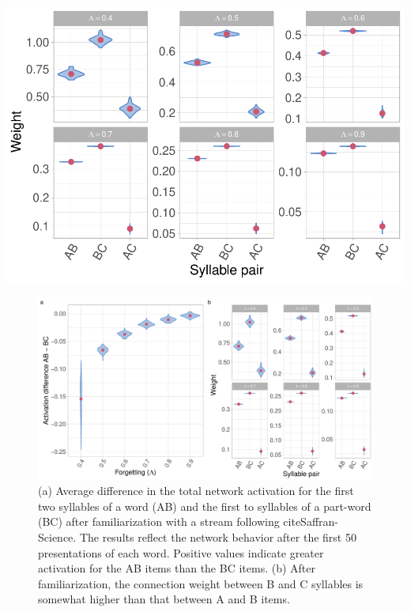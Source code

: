 \documentclass[
]{article}
\begin{document}
\includegraphics[width=1\linewidth]{tp_model_entrainment_files/figure-latex/basic-experiment-global-print-weights-after-2syll-plot-1}

\begin{figure}
\includegraphics[width=1\linewidth]{tp_model_entrainment_files/figure-latex/basic-experiment-global-print-act-and-weight-after-2syll-plot-1} \caption{(a) Average difference in the total network activation for the first two syllables of a word (AB) and the first to syllables of a part-word (BC) after familiarization with a stream following cite{Saffran-Science}. The results reflect the network behavior after the first 50 presentations of each word. Positive values indicate greater activation for the AB items than the BC items. (b) After familiarization, the connection weight between B and C syllables is somewhat higher than that between A and B items.}\label{fig:basic-experiment-global-print-act-and-weight-after-2syll-plot}
\end{figure}
\end{document}
